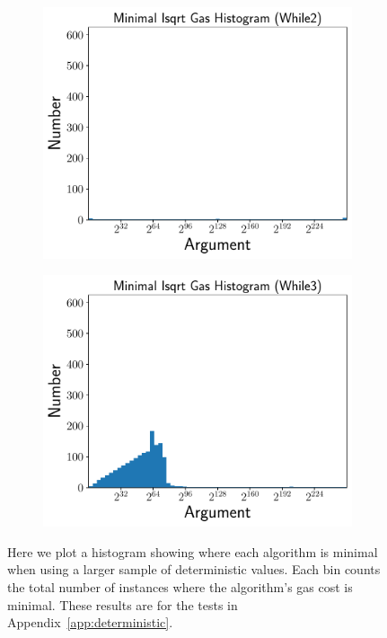 \begin{figure}[p]
    \begin{subfigure}[t]{0.45\textwidth}
    \includegraphics[width=\textwidth]{plots/minimal_hist_While2_ed.pdf}
    \end{subfigure}
    \begin{subfigure}[t]{0.45\textwidth}
    \includegraphics[width=\textwidth]{plots/minimal_hist_While3_ed.pdf}
    \end{subfigure}
    \caption{Here we plot a histogram showing where each algorithm is minimal
        when using a larger sample of deterministic values.
        Each bin counts the total number of instances where the algorithm's
        gas cost is minimal.
        These results are for the tests in Appendix~\ref{app:deterministic}.
        }
    \label{fig:minimal_gas_hist_ed}
\end{figure}
